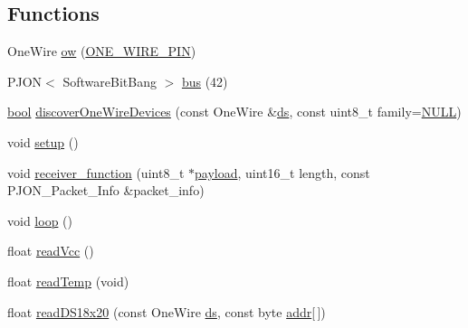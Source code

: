 \subsection*{Functions}
\begin{DoxyCompactItemize}
\item 
One\-Wire \hyperlink{OWP__DG__1w-adaptor_8ino_a53c83fb23c85b9fcc2903da7910645dc}{ow} (\hyperlink{OWP__DG__1w-adaptor_8ino_a394c6366a35129c8aece2e331c3263d5}{O\-N\-E\-\_\-\-W\-I\-R\-E\-\_\-\-P\-I\-N})
\item 
P\-J\-O\-N$<$ Software\-Bit\-Bang $>$ \hyperlink{OWP__DG__1w-adaptor_8ino_a2a18a88a065135ed87373e7895344c40}{bus} (42)
\item 
\hyperlink{stdbool_8h_abb452686968e48b67397da5f97445f5b}{bool} \hyperlink{OWP__DG__1w-adaptor_8ino_a7280c6634da12135cdb3ff5645c34e28}{discover\-One\-Wire\-Devices} (const One\-Wire \&\hyperlink{OWRain1_8ino_af75456870b9486275b406e13b003fb11}{ds}, const uint8\-\_\-t family=\hyperlink{stddef_8h_a070d2ce7b6bb7e5c05602aa8c308d0c4}{N\-U\-L\-L})
\item 
void \hyperlink{OWP__DG__1w-adaptor_8ino_a4fc01d736fe50cf5b977f755b675f11d}{setup} ()
\item 
void \hyperlink{OWP__DG__1w-adaptor_8ino_a76fc5e73c141f748dcc1809fdcfa1714}{receiver\-\_\-function} (uint8\-\_\-t $\ast$\hyperlink{Uno__Dragino__LoRa__GPS__Shield__TTN_8ino_a78a402d1762842473567de90b11ed256}{payload}, uint16\-\_\-t length, const P\-J\-O\-N\-\_\-\-Packet\-\_\-\-Info \&packet\-\_\-info)
\item 
void \hyperlink{OWP__DG__1w-adaptor_8ino_afe461d27b9c48d5921c00d521181f12f}{loop} ()
\item 
float \hyperlink{OWP__DG__1w-adaptor_8ino_a0b3195c3893f02cb1b80d878b89549d6}{read\-Vcc} ()
\item 
float \hyperlink{OWP__DG__1w-adaptor_8ino_ada109bb0cdc12131465dfe7a74f93b1e}{read\-Temp} (void)
\item 
float \hyperlink{OWP__DG__1w-adaptor_8ino_a871ed6a41673436aa85b1c06d1034594}{read\-D\-S18x20} (const One\-Wire \hyperlink{OWRain1_8ino_af75456870b9486275b406e13b003fb11}{ds}, const byte \hyperlink{OWP__DG__1w-adaptor_8ino_a0fc5da2e63a94559429ec9aec32f1831}{addr}\mbox{[}$\,$\mbox{]})
\end{DoxyCompactItemize}

